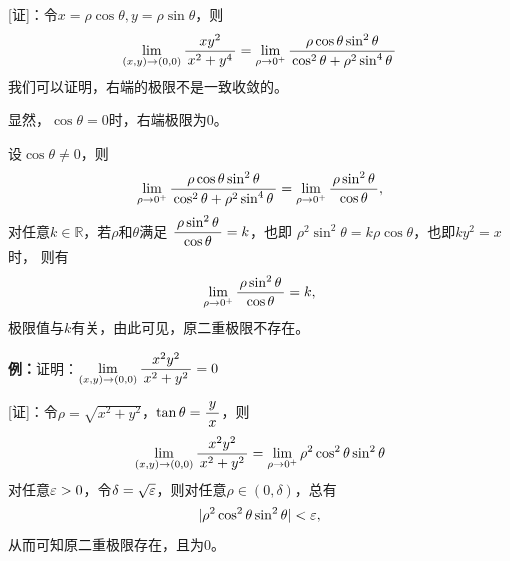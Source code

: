 \begin{center}
\end{center}

[证]：令$x=\rho\cos\theta,y=\rho\sin\theta$，则
$$\lim\limits_{(x,y)\to(0,0)}\displaystyle\frac{\,{xy^2}\,}{\,{x^2+y^4}\,}
=\lim\limits_{\rho\to0^+}\displaystyle\frac{\,{\rho\cos\theta\sin^2\theta}\,}{\,{\cos^2\theta+\rho^2\sin^4\theta}\,}$$
我们可以证明，右端的极限不是一致收敛的。

显然，$\cos\theta=0$时，右端极限为$0$。

设$\cos\theta\ne 0$，则
$$\lim\limits_{\rho\to0^+}\displaystyle\frac{\,{\rho\cos\theta\sin^2\theta}\,}{\,{\cos^2\theta+\rho^2\sin^4\theta}\,}
=\lim\limits_{\rho\to0^+}\displaystyle\frac{\,{\rho\sin^2\theta}\,}{\,{\cos\theta}\,},$$
对任意$k\in\mathbb{R}，$若$\rho$和$\theta$满足
$\displaystyle\frac{\,{\rho\sin^2\theta}\,}{\,{\cos\theta}\,}=k$，也即
$\rho^2\sin^2\theta=k\rho\cos\theta$，也即$ky^2=x$时，
则有
$$\lim\limits_{\rho\to0^+}\displaystyle\frac{\,{\rho\sin^2\theta}\,}{\,{\cos\theta}\,}=k,$$
极限值与$k$有关，由此可见，原二重极限不存在。\fin

{\bf 例：}证明：$\lim\limits_{(x,y)\to(0,0)}\displaystyle\frac{\,{x^2y^2}\,}{\,{x^2+y^2}\,}=0$
	
[证]：令$\rho=\sqrt{x^2+y^2}$，$\tan\theta=\displaystyle\frac{\,{y}\,}{\,{x}\,}$，则	
$$\lim\limits_{(x,y)\to(0,0)}\displaystyle\frac{\,{x^2y^2}\,}{\,{x^2+y^2}\,}
=\lim\limits_{\rho\to{0^+}}\rho^2\cos^2\theta\sin^2\theta$$
对任意$\varepsilon>0$，令$\delta=\sqrt{\varepsilon}$，则对任意$\rho\in(0,\delta)$，总有
$$|\rho^2\cos^2\theta\sin^2\theta|<\varepsilon,$$
从而可知原二重极限存在，且为$0$。\fin

